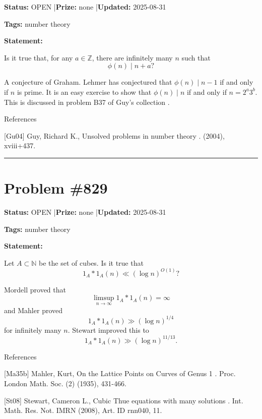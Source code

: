 \documentclass{article}
\begin{document}
\noindent\textbf{Status:} OPEN \quad|\quad \textbf{Prize:} none \quad|\quad \textbf{Updated:} 2025-08-31

\noindent\textbf{Tags:} number theory

\medskip

\noindent\textbf{Statement:}

Is it true that, for any $a\in\mathbb{Z}$, there are infinitely many $n$ such that\[\phi(n) \mid n+a?\]




A conjecture of Graham. Lehmer has conjectured that $\phi(n)\mid n-1$ if and only if $n$ is prime. It is an easy exercise to show that $\phi(n) \mid n$ if and only if $n=2^a3^b$. This is discussed in problem B37 of Guy's collection \cite{Gu04}.




References

[Gu04] Guy, Richard K., Unsolved problems in number theory . (2004), xviii+437.

\noindent\rule{\linewidth}{0.4pt}


\section{Problem \#829}
\label{prob:829}

\noindent\textbf{Status:} OPEN \quad|\quad \textbf{Prize:} none \quad|\quad \textbf{Updated:} 2025-08-31

\noindent\textbf{Tags:} number theory

\medskip

\noindent\textbf{Statement:}

Let $A\subset\mathbb{N}$ be the set of cubes. Is it true that\[1_A\ast 1_A(n) \ll (\log n)^{O(1)}?\]




Mordell proved that\[\limsup_{n\to \infty} 1_A\ast 1_A(n)=\infty\]and Mahler \cite{Ma35b} proved\[1_A\ast 1_A(n) \gg (\log n)^{1/4}\]for infinitely many $n$. Stewart \cite{St08} improved this to\[1_A\ast 1_A(n) \gg (\log n)^{11/13}.\]




References

[Ma35b] Mahler, Kurt, On the Lattice Points on Curves of Genus 1 . Proc. London Math. Soc. (2) (1935), 431-466.

[St08] Stewart, Cameron L., Cubic Thue equations with many solutions . Int. Math. Res. Not. IMRN (2008), Art. ID rnn040, 11.
\end{document}
